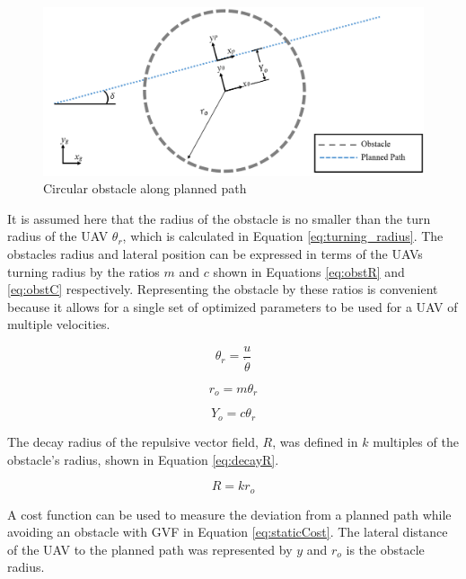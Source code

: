 \documentclass[numbered,pdftex]{ohio-etd}
\begin{document}
\begin{figure}[H]
	\centering
	\includegraphics[width=14cm]{Figures/methods/obstacleOnPath}
	\caption{Circular obstacle along planned path}
	\label{fig:obstacleonpath}
\end{figure}

 It is assumed here that the radius of the obstacle is no smaller than the turn radius of the UAV $\theta_r$, which is calculated in Equation \ref{eq:turning_radius}. The obstacles radius and lateral position can be expressed in terms of the UAVs turning radius by the ratios $m$ and $c$ shown in Equations \ref{eq:obstR} and \ref{eq:obstC} respectively. Representing the obstacle by these ratios is convenient because it allows for a single set of optimized parameters to be used for a UAV of multiple velocities. 
 


\begin{equation}
\label{eq:turning_radius}
\theta_r = \frac{u}{\dot{\theta}}
\end{equation}

\begin{equation}
\label{eq:obstR}
r_o = m \theta_r
\end{equation}

\begin{equation}
\label{eq:obstC}
Y_o = c \theta_r
\end{equation}

The decay radius of the repulsive vector field, $R$, was defined in $k$ multiples of the obstacle's radius, shown in Equation \ref{eq:decayR}. 
 
 \begin{equation}
 \label{eq:decayR}
 R = k r_o
 \end{equation}
 
 

 A cost function can be used to measure the deviation from a planned path while avoiding an obstacle with GVF in Equation \ref{eq:staticCost}. The lateral distance of the UAV to the planned path was represented by $y$ and $r_o$ is the obstacle radius.
 
\end{document}
